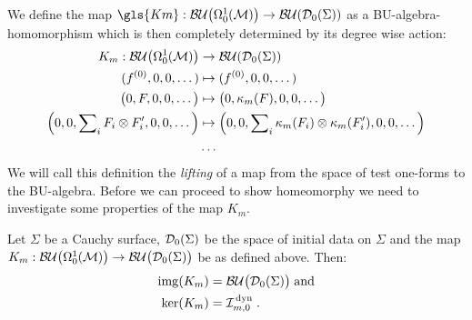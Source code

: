 We define the map $\gls{Km} : \BUOmega \to \BU(\Dzs) $ as a BU-algebra-homomorphism which is then completely determined by its degree wise action:
\begin{align}
	K_m : {\mathcal{BU}\big(\Omega^1_0(\mathcal{M})\big)} &\to \mathcal{BU}(\mathcal{D}_{0}(\Sigma)) \\
	(f^{(0)},0,0,\dots) &\mapsto 	(f^{(0)},0,0,\dots) \notag \\
	\big(0,F,0,0,\dots\big) &\mapsto 	\big(0, \kappa_m (F),0,0,\dots\big)\notag \\
		\left(0,0, \sum\nolimits_i F_i \otimes F_i',0,0,\dots\right) &\mapsto 	\left(0,0, \sum\nolimits_i \kappa_m (F_i) \otimes \kappa_m (F'_i) ,0,0,\dots\right) \notag\\
		&\dots\notag
\end{align}
We will call this definition the \emph{lifting} of a map from the space of test one-forms to the BU-algebra.
Before we can proceed to show homeomorphy we need to investigate some properties of the map $K_m$.
\begin{lemma}
	Let $\Sigma$ be a Cauchy surface, $\mathcal{D}_{0}(\Sigma)$ be the space of initial data on $\Sigma$ and the map $K_m : {\mathcal{BU}\big(\Omega^1_0(\mathcal{M})\big)} \to  \mathcal{BU}\big(\mathcal{D}_{0}(\Sigma)\big) $ be as defined above. Then:
	\begin{align}
	\mathrm{img}{}(K_m) &=  \mathcal{BU}\big(\mathcal{D}_{0}(\Sigma)\big)  \; \text{and}\\
		\textrm{ker}{\left(K_m\right)} &= \mathcal{I}_{m,0}^\text{\,dyn} \;.
	\end{align}
\end{lemma}
